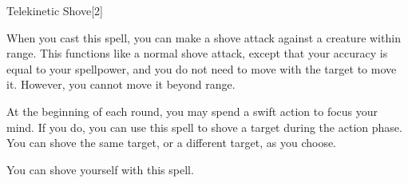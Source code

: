 \begin{spellsection}{Telekinetic Shove}[2]
    \begin{spellheader}
    \end{spellheader}
    \begin{spellcontent}
        \begin{spelltargetinginfo}
        \end{spelltargetinginfo}
        \begin{spelleffects}
            \spelleffect When you cast this spell, you can make a shove attack against a creature within \rngclose range.
            This functions like a normal shove attack, except that your accuracy is equal to your spellpower, and you do not need to move with the target to move it.
            However, you cannot move it beyond \rngclose range.

            At the beginning of each round, you may spend a swift action to focus your mind.
            If you do, you can use this spell to shove a target during the action phase.
            You can shove the same target, or a different target, as you choose.
            \spelldur \durshort
        \end{spelleffects}
    \end{spellcontent}
    \begin{spellfooter}
        \spellnotes You can shove yourself with this spell.
        \miscastexplode
    \end{spellfooter}
\end{spellsection}

